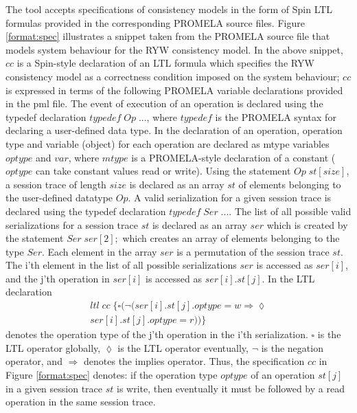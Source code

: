 \documentclass[journal,compsoc]{IEEEtran}
\begin{document}
  \par The tool accepts specifications of consistency models in the form of Spin LTL  formulas provided in the corresponding PROMELA source files.  Figure \ref{format:spec} illustrates a snippet taken from the  PROMELA  source file that models system behaviour for the RYW consistency model. In the above snippet, $\mathit{cc}$ is a Spin-style declaration of an LTL formula which specifies the RYW consistency model as a correctness condition imposed on the system behaviour; $\mathit{cc}$ is expressed in terms of the following PROMELA variable declarations provided in the pml file. The event of execution of an operation is declared using the typedef declaration  $\mathit{typedef}\; \mathit{Op}\; ...$, where $\mathit{typedef}$ is the PROMELA syntax for declaring a user-defined data type. In the declaration of an operation, operation type and variable (object) for each operation are declared as  mtype variables $\mathit{optype}$ and $\mathit{var}$, where $\mathit{mtype} $ is a PROMELA-style declaration of a constant ($\mathit{optype}$ can take constant values read or write).  Using the statement $\mathit{Op} \; \mathit{st}[\mathit{size}]$, a session trace of length $\mathit{size}$ is declared as an array $\mathit{st} $ of elements belonging to the user-defined datatype $\mathit{Op}$.  A valid serialization for a given session trace is declared using the typedef declaration $\mathit{typedef}\; \mathit{Ser}\; ...$.  The list of all possible valid serializations for a session trace $\mathit{st}$ is declared as an array $\mathit{ser}$ which is created by the statement $\mathit{Ser}\; \mathit{ser}[2];$ which creates an array of elements belonging to the type $\mathit{Ser}$. Each element in the array $\mathit{ser}$ is a permutation of the session trace $\mathit{st}$. The i'th element in the list of all possible serializations $\mathit{ser}$ is accessed as $\mathit{ser}[i]$, and the j'th operation in $\mathit{ser}[i]$ is accessed as $\mathit{ser}[i].\mathit{st}[j]$. In the LTL declaration 
  \begin{align*}%
 ltl \; \mathit{cc}  \; \{  \square ( \lnot (\mathit{ser}[i].\mathit{st}[j].\mathit{optype} = w 
   \Rightarrow \lozenge \\  \mathit{ser}[i].\mathit{st}[j].\mathit{optype} = r)) \}
    \end{align*}
     denotes the operation type of the j'th operation in the i'th serialization. $\square$ is the LTL operator globally, $\lozenge$ is the LTL operator eventually, $\lnot$ is the negation operator, and   $\Rightarrow$ denotes the implies operator.  Thus, the specification $cc$ in  Figure \ref{format:spec} denotes: if the operation type $\mathit{optype}$ of an operation $\mathit{st}[j]$ in a given session trace $\mathit{st}$ is write, then eventually it must be followed by a read operation in the same session trace.
\end{document}
